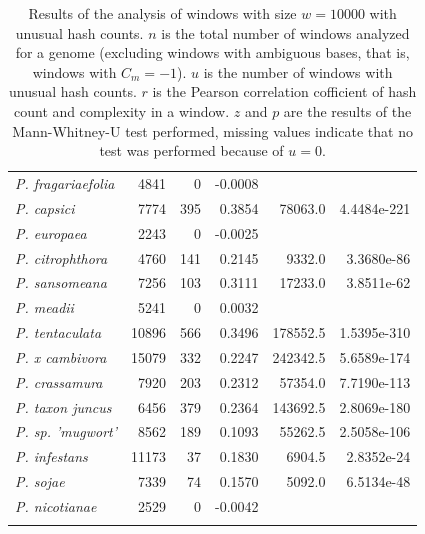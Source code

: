 \begin{longtable}{@{}lrrrrr@{}}
  \textit{P. fragariaefolia}          & 4841       & 0          & -0.0008      &              &                         \\
  \textit{P. capsici}                 & 7774       & 395        & 0.3854       & 78063.0      & 4.4484e-221  \\
  \textit{P. europaea}                & 2243       & 0          & -0.0025      &              &                         \\
  \textit{P. citrophthora}            & 4760       & 141        & 0.2145       & 9332.0       & 3.3680e-86   \\
  \textit{P. sansomeana}              & 7256       & 103        & 0.3111       & 17233.0      & 3.8511e-62   \\
  \textit{P. meadii}                  & 5241       & 0          & 0.0032       &              &                         \\
  \textit{P. tentaculata}             & 10896      & 566        & 0.3496       & 178552.5     & 1.5395e-310   \\
  \textit{P. x cambivora}             & 15079      & 332        & 0.2247       & 242342.5     & 5.6589e-174  \\
  \textit{P. crassamura}              & 7920       & 203        & 0.2312       & 57354.0      & 7.7190e-113  \\
  \textit{P. taxon juncus}            & 6456       & 379        & 0.2364       & 143692.5     & 2.8069e-180  \\
  \textit{P. sp. 'mugwort'}           & 8562       & 189        & 0.1093       & 55262.5      & 2.5058e-106  \\
  \textit{P. infestans}               & 11173      & 37         & 0.1830       & 6904.5       & 2.8352e-24   \\
  \textit{P. sojae}                   & 7339       & 74         & 0.1570       & 5092.0       & 6.5134e-48    \\
  \textit{P. nicotianae}              & 2529       & 0          & -0.0042      &              &                         \\ \bottomrule
  
  \caption[Results of the analysis of windows with unusual hash counts]{Results
  of the analysis of windows with size $w=10000$ with unusual hash counts. $n$
  is the total number of windows analyzed for a genome (excluding windows with
  ambiguous bases, that is, windows with $C_m=-1$). $u$ is the number of windows
  with unusual hash counts. $r$ is the Pearson correlation cofficient of hash
  count and complexity in a window. $z$ and $p$ are the results of the
  Mann-Whitney-U test performed, missing values indicate that no test was
  performed because of $u=0$.}
  \label{ta:hashCountComplexity}
\end{longtable}

